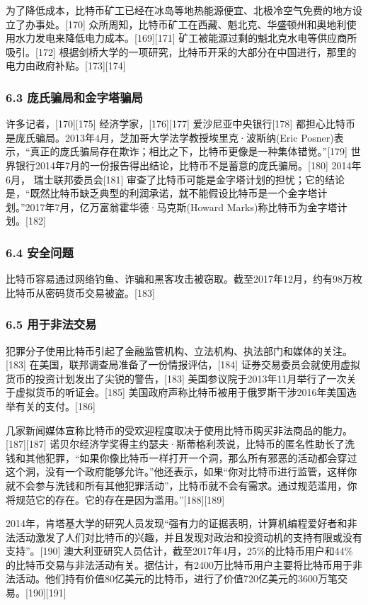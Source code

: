 为了降低成本，比特币矿工已经在冰岛等地热能源便宜、北极冷空气免费的地方设立了办事处。[170] 众所周知，比特币矿工在西藏、魁北克、华盛顿州和奥地利使用水力发电来降低电力成本。[169][171] 矿工被能源过剩的魁北克水电等供应商所吸引。[172] 根据剑桥大学的一项研究，比特币开采的大部分在中国进行，那里的电力由政府补贴。[173][174]
\subsubsection{6.3 庞氏骗局和金字塔骗局}
许多记者，[170][175] 经济学家，[176][177] 爱沙尼亚中央银行[178] 都担心比特币是庞氏骗局。2013年4月，芝加哥大学法学教授埃里克·波斯纳(Eric Posner)表示，“真正的庞氏骗局存在欺诈；相比之下，比特币更像是一种集体错觉。”[179] 世界银行2014年7月的一份报告得出结论，比特币不是蓄意的庞氏骗局。[180] 2014年6月， 瑞士联邦委员会[181] 审查了比特币可能是金字塔计划的担忧；它的结论是，“既然比特币缺乏典型的利润承诺，就不能假设比特币是一个金字塔计划。”2017年7月，亿万富翁霍华德·马克斯(Howard Marks)称比特币为金字塔计划。[182]
\subsubsection{6.4 安全问题}
比特币容易通过网络钓鱼、诈骗和黑客攻击被窃取。截至2017年12月，约有98万枚比特币从密码货币交易被盗。[183]
\subsubsection{6.5 用于非法交易}
犯罪分子使用比特币引起了金融监管机构、立法机构、执法部门和媒体的关注。[183] 在美国，联邦调查局准备了一份情报评估，[184] 证券交易委员会就使用虚拟货币的投资计划发出了尖锐的警告，[183] 美国参议院于2013年11月举行了一次关于虚拟货币的听证会。[185] 美国政府声称比特币被用于俄罗斯干涉2016年美国选举有关的支付。[186]

几家新闻媒体宣称比特币的受欢迎程度取决于使用比特币购买非法商品的能力。[187][187] 诺贝尔经济学奖得主约瑟夫·斯蒂格利茨说，比特币的匿名性助长了洗钱和其他犯罪，“如果你像比特币一样打开一个洞，那么所有邪恶的活动都会穿过这个洞，没有一个政府能够允许。”他还表示，如果“你对比特币进行监管，这样你就不会参与洗钱和所有其他犯罪活动”，比特币就不会有需求。通过规范滥用，你将规范它的存在。它的存在是因为滥用。”[188][189]

2014年，肯塔基大学的研究人员发现“强有力的证据表明，计算机编程爱好者和非法活动激发了人们对比特币的兴趣，并且发现对政治和投资动机的支持有限或没有支持”。[190] 澳大利亚研究人员估计，截至2017年4月，25\%的比特币用户和44\%的比特币交易与非法活动有关。据估计，有2400万比特币用户主要将比特币用于非法活动。他们持有价值80亿美元的比特币，进行了价值720亿美元的3600万笔交易。[190][191]

